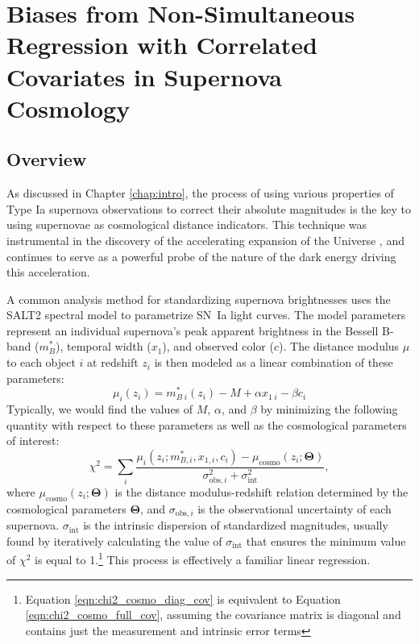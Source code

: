 \chapter{Biases from Non-Simultaneous Regression with Correlated Covariates in Supernova Cosmology}
\label{chap:reg_bias}

\newcommand{\sgn}{\text{sgn}}
\newcommand{\sigint}{\sigma_{\text{int}}}

\section{Overview} \label{sec:intro}
As discussed in Chapter \ref{chap:intro}, the process of using various properties of Type Ia supernova observations to correct their absolute magnitudes is the key to using supernovae as cosmological distance indicators. This technique was instrumental in the discovery of the accelerating expansion of the Universe \citep{perlmutter_measurements_1999, riess_observational_1998}, and continues to serve as a powerful probe of the nature of the dark energy driving this acceleration.

A common analysis method for standardizing supernova brightnesses uses the SALT2 spectral model \citep{guy_salt2_2007, betoule_improved_2014, mosher_cosmological_2014} to parametrize SN~Ia light curves. The model parameters represent an individual supernova's peak apparent brightness in the Bessell B-band ($m_B^*$), temporal width ($x_1$), and observed color ($c$). The distance modulus $\mu$ to each object $i$ at redshift $z_i$ is then modeled as a linear combination of these parameters:
\begin{equation}
    \mu_i(z_i) = m_{B\;i}^*(z_i) - M + \alpha x_{1\;i} - \beta c_i
    \label{eqn:salt_mu}
\end{equation}
Typically, we would find the values of $M$, $\alpha$, and $\beta$ by minimizing the following quantity with respect to these parameters as well as the cosmological parameters of interest:
\begin{equation}
    \chi^2 = \displaystyle\sum_{i} \frac{\mu_i(z_i; m_{B, i}^*, x_{1,i}, c_i)-\mu_\text{cosmo}(z_i; \bm{\Theta})}{\sigma_{\text{obs},i}^2+\sigint^2},
    \label{eqn:chi2_cosmo_diag_cov}
\end{equation}
where $\mu_\text{cosmo}(z_i;\bm{\Theta})$ is the distance modulus-redshift relation determined by the cosmological parameters $\bm{\Theta}$, and $\sigma_{\text{obs},i}$ is the observational uncertainty of each supernova. $\sigma_\text{int}$ is the intrinsic dispersion of standardized magnitudes, usually found by iteratively calculating the value of $\sigint$ that ensures the minimum value of $\chi^2$ is equal to 1.\footnote{Equation \ref{eqn:chi2_cosmo_diag_cov} is equivalent to Equation \ref{eqn:chi2_cosmo_full_cov}, assuming the covariance matrix is diagonal and contains just the measurement and intrinsic error terms} This process is effectively a familiar linear regression.

